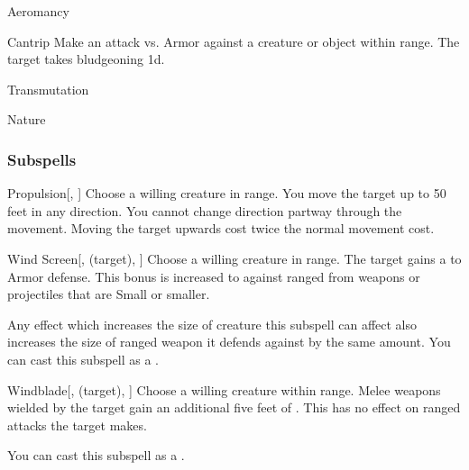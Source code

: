 
\begin{spellsection}{Aeromancy}

\begin{spellheader}
\end{spellheader}


\begin{ability}{Cantrip}
Make an attack vs. Armor against a creature or object within \rngmed range.
\hit The target takes bludgeoning  \minus1d.
\end{ability}




 Transmutation

 Nature
\end{spellsection}


\subsubsection{Subspells}


\begin{ability}[\nth{1}]{Propulsion}[, ]
Choose a willing creature in \rngclose range.
You move the target up to 50 feet in any direction.
You cannot change direction partway through the movement.
Moving the target upwards cost twice the normal movement cost.
\end{ability}
\vspace{0.25em}


\begin{ability}[\nth{1}]{Wind Screen}[,  (target), ]
Choose a willing creature in \rngclose range.
The target gains a   to Armor defense.
This bonus is increased to  against ranged  from weapons or projectiles that are Small or smaller.

Any effect which increases the size of creature this subspell can affect also increases the size of ranged weapon it defends against by the same amount.
You can cast this subspell as a .
\end{ability}
\vspace{0.25em}


\begin{ability}[\nth{1}]{Windblade}[,  (target), ]
Choose a willing creature within \rngclose range.
Melee weapons wielded by the target gain an additional five feet of .
This has no effect on ranged attacks the target makes.

You can cast this subspell as a .
\end{ability}
\vspace{0.25em}


